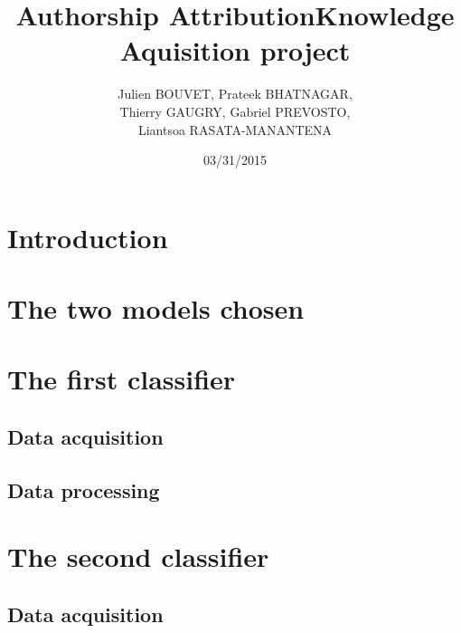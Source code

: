 \documentclass[12pt]{article}
\title{Authorship Attribution\smallbreak Knowledge Aquisition project}
\author{Julien \textsc{BOUVET}, Prateek \textsc{BHATNAGAR}, \\
	Thierry \textsc{GAUGRY}, Gabriel \textsc{PREVOSTO}, \\
	Liantsoa \textsc{RASATA-MANANTENA}}
\date{03/31/2015}
\begin{document}
\maketitle

\newpage
\tableofcontents
\newpage

\section{Introduction}					\label{sec:introduction}			

\section{The two models chosen}			\label{sec:models}				


\section{The first classifier}				\label{sec:classifier1}
\subsection{Data acquisition}				\label{sec:data1}				
\subsection{Data processing}				\label{sec:processing1}			

\section{The second classifier}				\label{sec:classifier2}
\subsection{Data acquisition}				\label{sec:data2}				
\end{document}
